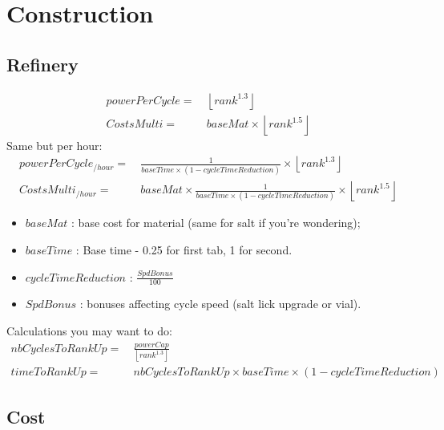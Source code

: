 \chapter{Construction}
    \section{Refinery}
        \begin{align*}
            powerPerCycle = &\ \left\lfloor rank^{1.3}\right\rfloor 
            \\
            CostsMulti = &\ baseMat \times \left\lfloor rank^{1.5}\right\rfloor 
        \end{align*}
        Same but per hour:
        \begin{align*}
            powerPerCycle_{/hour} = &\ \frac{1}{baseTime \times (1-cycleTimeReduction)} \times \left\lfloor rank^{1.3}\right\rfloor 
            \\
            CostsMulti_{/hour} = &\ baseMat \times \frac{1}{baseTime \times (1-cycleTimeReduction)} \times \left\lfloor rank^{1.5}\right\rfloor 
        \end{align*}
        \begin{itemize}
            \item $baseMat$ : base cost for material (same for salt if you're wondering);
            \item $baseTime$ : Base time - 0.25 for first tab, 1 for second.
            \item $cycleTimeReduction$ : $\frac{SpdBonus}{100}$
            \item $SpdBonus$ : bonuses affecting cycle speed (salt lick upgrade or vial).
        \end{itemize}
        Calculations you may want to do:
        \begin{align*}
            nbCyclesToRankUp = &\ \frac{powerCap}{\left\lfloor rank^{1.3}\right\rfloor } 
            \\ 
            timeToRankUp = &\ nbCyclesToRankUp \times baseTime \times (1-cycleTimeReduction)
        \end{align*}
    \section{Cost}

